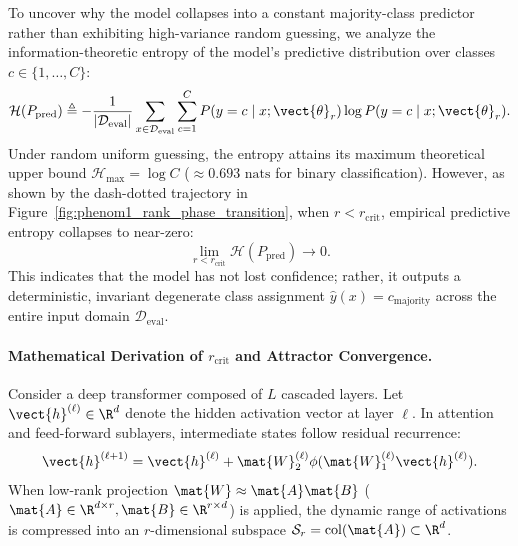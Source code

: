 To uncover why the model collapses into a constant majority-class predictor rather than exhibiting high-variance random guessing, we analyze the information-theoretic entropy of the model's predictive distribution over classes $c \in \{1, \dots, C\}$:
\begin{equation}
\mathcal{H}(P_{\text{pred}}) \triangleq - \frac{1}{|\mathcal{D}_{\text{eval}}|} \sum_{x \in \mathcal{D}_{\text{eval}}} \sum_{c=1}^{C} P(y=c \mid x; \vect{\theta}_r) \log P(y=c \mid x; \vect{\theta}_r).
\end{equation}
Under random uniform guessing, the entropy attains its maximum theoretical upper bound $\mathcal{H}_{\max} = \log C$ ($\approx 0.693\text{ nats}$ for binary classification). However, as shown by the dash-dotted trajectory in Figure~\ref{fig:phenom1_rank_phase_transition}, when $r < r_{\text{crit}}$, empirical predictive entropy collapses to near-zero:
\begin{equation}
\lim_{r < r_{\text{crit}}} \mathcal{H}(P_{\text{pred}}) \to 0.
\end{equation}
This indicates that the model has not lost confidence; rather, it outputs a deterministic, invariant degenerate class assignment $\hat{y}(x) = c_{\text{majority}}$ across the entire input domain $\mathcal{D}_{\text{eval}}$.

\paragraph{Mathematical Derivation of $r_{\text{crit}}$ and Attractor Convergence.}
Consider a deep transformer composed of $L$ cascaded layers. Let $\vect{h}^{(\ell)} \in \R^d$ denote the hidden activation vector at layer $\ell$. In attention and feed-forward sublayers, intermediate states follow residual recurrence:
\begin{equation}
\vect{h}^{(\ell+1)} = \vect{h}^{(\ell)} + \mat{W}_2^{(\ell)} \phi(\mat{W}_1^{(\ell)} \vect{h}^{(\ell)}).
\end{equation}
When low-rank projection $\mat{W} \approx \mat{A}\mat{B}$ ($\mat{A} \in \R^{d \times r}, \mat{B} \in \R^{r \times d}$) is applied, the dynamic range of activations is compressed into an $r$-dimensional subspace $\mathcal{S}_r = \operatorname{col}(\mat{A}) \subset \R^d$.

